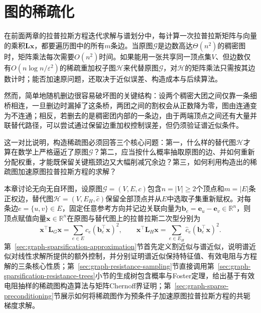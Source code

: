 \chapter{图的稀疏化}
\label{chap:graph-sparsification}

在前面两章的拉普拉斯方程迭代求解与谱划分中，每计算一次拉普拉斯矩阵与向量的乘积$\bm L\bm x$，都要遍历图中的所有$m$条边。当原图$\mathcal G$是边数高达$\Theta(n^2)$的稠密图时，矩阵乘法每次需要$O(n^2)$时间。如果能用一张共享同一顶点集$V$、但边数仅有$O(n\log n/\varepsilon^2)$的稀疏重加权子图$\mathcal H$来代替原图$\mathcal G$，对$\mathcal H$的矩阵乘法只需按其边数计时；能否加速原问题，还取决于近似误差、构造成本与后续算法。

然而，简单地随机删边很容易破坏图的关键结构：设两个稠密大团之间仅靠一条细桥相连，一旦删边时漏掉了这条桥，两团之间的割权会从正数降为零，图由连通变为不连通；相反，若删去的是稠密团内部的一条边，由于两端顶点之间还有大量并联替代路径，可以尝试通过保留边重加权控制误差，但仍须验证谱近似条件。

这一对比说明，构造稀疏图必须回答三个核心问题：第一，什么样的替代图$\mathcal H$才算在数学上严格逼近了原图$\mathcal G$？第二，应当按什么概率抽取原图的边、并如何重新分配权重，才能既保留关键瓶颈边又大幅削减冗余边？第三，如何利用构造出的稀疏图加速原图拉普拉斯方程的求解？

本章讨论无向无自环图，设原图$\mathcal G=(V,E,c)$包含$n=|V|\geq 2$个顶点和$m=|E|$条正权边，替代图$\mathcal H=(V,E_H,\widehat c)$保留全部顶点并从$E$中选取子集重新赋权。对每条边$e=\{u,v\}\in E$，固定任意参考方向并记边关联向量为$\bm b_e=\bm e_u-\bm e_v\in\mathbb R^n$，则顶点赋值向量$\bm x\in\mathbb R^n$在原图与替代图上的拉普拉斯二次型分别为
\[
\bm x^\top\bm L_G\bm x
=\sum_{e\in E}c_e(\bm b_e^\top\bm x)^2,
\qquad
\bm x^\top\bm L_H\bm x
=\sum_{e\in E_H}\widehat c_e(\bm b_e^\top\bm x)^2.
\]
第~\ref{sec:graph-sparsification-approximation}节首先定义割近似与谱近似，说明谱近似对线性求解所提供的额外控制，并分别证明谱近似保持特征值、有效电阻与方程解的三条核心性质；第~\ref{sec:graph-resistance-sampling}节直接调用第~\ref{sec:graph-sparsification-resistance-trees}小节的生成树包含概率与Foster定理，给出基于有效电阻抽样的稀疏图构造算法与矩阵Chernoff界证明；第~\ref{sec:graph-sparse-preconditioning}节展示如何将稀疏图作为预条件子加速原图拉普拉斯方程的共轭梯度求解。





